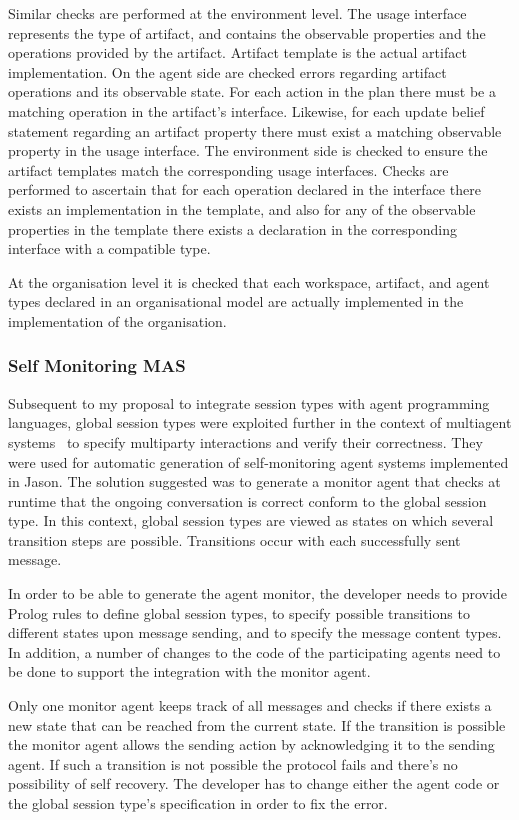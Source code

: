 \documentclass[a4paper,12pt,oneside,fleqn]{book} %
\begin{document}
{Similar checks are performed at the environment level. The usage interface
represents the type of artifact, and contains the observable properties and
the operations provided by the artifact. Artifact template is the actual
artifact implementation. On the agent side are checked errors regarding
artifact operations and its observable state. For each action in the plan
there must be a matching operation in the artifact's interface.  Likewise,
for each update belief statement regarding an artifact property there must
exist a matching observable property in the usage interface. The
environment side is checked to ensure the artifact templates match the
corresponding usage interfaces. Checks are performed to ascertain
that for each operation declared in the interface there exists an
implementation in the template, and also for any of the observable properties
in the template there exists a declaration in the corresponding interface
with a compatible type.

At the organisation level it is checked that each workspace, artifact, and
agent types declared in an organisational model are actually implemented in
the implementation of the organisation.

\subsubsection{Self Monitoring MAS} %
Subsequent to my proposal to integrate session types with agent programming
languages, global session types were exploited further in the context of
multiagent systems~\cite{DBLP:conf/dalt/AnconaDM12} to specify multiparty
interactions and verify their correctness. They were used for automatic
generation of self-monitoring agent systems implemented in Jason. The
solution suggested was to generate a monitor agent that checks at runtime
that the ongoing conversation is correct conform to the global session
type. In this context, global session types are viewed as states on which
several transition steps are possible. Transitions occur with each
successfully sent message.

In order to be able to generate the agent monitor, the developer needs to
provide Prolog rules to define global session types, to specify possible
transitions to different states upon message sending, and to specify the
message content types. In addition, a number of changes to the code of the
participating agents need to be done to support the integration with the
monitor agent.

Only one monitor agent keeps track of all messages and checks if there
exists a new state that can be reached from the current state. If the
transition is possible the monitor agent allows the sending action by
acknowledging it to the sending agent. If such a transition is not possible
the protocol fails and there's no possibility of self recovery.  The
developer has to change either the agent code or the global session type's
specification in order to fix the error.

}
\end{document}

